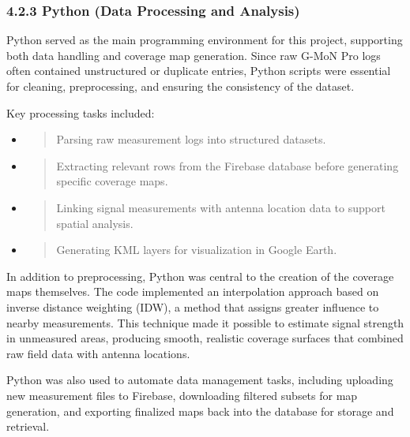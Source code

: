 \documentclass[11pt]{article}
\begin{document}
\hypertarget{python-data-processing-and-analysis}{%
\subsubsection{4.2.3 Python (Data Processing and
Analysis)}\label{python-data-processing-and-analysis}}

Python\cite{python2025} served as the main programming environment for this project,
supporting both data handling and coverage map generation. Since raw
G-MoN Pro logs often contained unstructured or duplicate entries, Python
scripts were essential for cleaning, preprocessing, and ensuring the
consistency of the dataset.

Key processing tasks included:

\begin{itemize}
\item
  \begin{quote}
  Parsing raw measurement logs into structured datasets.
  \end{quote}
\item
  \begin{quote}
  Extracting relevant rows from the Firebase database before generating
  specific coverage maps.
  \end{quote}
\item
  \begin{quote}
  Linking signal measurements with antenna location data to support
  spatial analysis.
  \end{quote}
\item
  \begin{quote}
  Generating KML layers for visualization in Google Earth.
  \end{quote}
\end{itemize}

In addition to preprocessing, Python was central to the creation of the
coverage maps themselves. The code implemented an interpolation approach
based on inverse distance weighting (IDW), a method that assigns greater
influence to nearby measurements\cite{shepard1968}. This technique made it
possible to estimate signal strength in unmeasured areas, producing
smooth, realistic coverage surfaces that combined raw field data with
antenna locations.

Python was also used to automate data management tasks, including
uploading new measurement files to Firebase, downloading filtered
subsets for map generation, and exporting finalized maps back into the
database for storage and retrieval.
\end{document}
